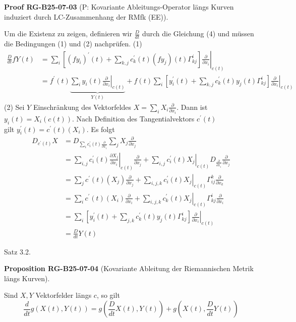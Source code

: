\documentclass[10pt, letterpaper]{article}
\newcommand{\CustomHeading}[3]{%
  \par\medskip\noindent%
  \textbf{#1 #2} \textnormal{(#3)}.\enskip%
}
\newenvironment{PROP}[2]{\begin{unitbox}\CustomHeading{Proposition}{#1}{#2}}{\end{unitbox}}
\newenvironment{PROOF}[2]{\begin{unitbox}\CustomHeading{Proof}{#1}{#2}}{\end{unitbox}}
\begin{document}
\begin{PROOF}{RG-B25-07-03}{P: Kovariante Ableitungs-Operator längs Kurven induziert durch LC-Zusammenhang der RMfk (EE)}
Um die Existenz zu zeigen, definieren wir $\frac{D}{d t}$ durch die Gleichung (4) und müssen die Bedingungen (1) und (2) nachprüfen.
(1)
$$
\begin{aligned}
\frac{D}{d t} f Y(t) & =\left.\sum_{i}\left[\left(f y_{i}\right)^{\prime}(t)+\sum_{k, j} c_{k}^{\prime}(t)\left(f y_{j}\right)(t) \Gamma_{k j}^{i}\right] \frac{\partial}{\partial x_{i}}\right|_{c(t)} \\
& =f^{\prime}(t) \underbrace{\left.\sum_{i} y_{i}(t) \frac{\partial}{\partial x_{i}}\right|_{c(t)}}_{Y(t)}+\left.f(t) \sum_{i}\left[y_{i}^{\prime}(t)+\sum_{k, j} c_{k}^{\prime}(t) y_{j}(t) \Gamma_{k j}^{i}\right] \frac{\partial}{\partial x_{i}}\right|_{c(t)}
\end{aligned}
$$
(2) Sei $Y$ Einschränkung des Vektorfeldes $X=\sum_{i} X_{i} \frac{\partial}{\partial x_{i}}$. Dann ist $y_{i}(t)=X_{i}(c(t))$. Nach Definition des Tangentialvektors $c^{\prime}(t)$\\
gilt $y_{i}^{\prime}(t)=c^{\prime}(t)\left(X_{i}\right)$. Es folgt
$$
\begin{aligned}
D_{c^{\prime}(t)} X & =D_{\sum_{i} c_{i}^{\prime}(t) \frac{\partial}{\partial x_{i}}} \sum_{j} X_{j} \frac{\partial}{\partial x_{j}} \\
& =\left.\sum_{i, j} c_{i}^{\prime}(t) \frac{\partial X_{j}}{\partial x_{i}}\right|_{c(t)} \frac{\partial}{\partial x_{j}}+\left.\sum_{i, j} c_{i}^{\prime}(t) X_{j}\right|_{c(t)} D_{\frac{\partial}{\partial x_{i}}} \frac{\partial}{\partial x_{j}} \\
& =\sum_{j} c^{\prime}(t)\left(X_{j}\right) \frac{\partial}{\partial x_{j}}+\left.\sum_{i, j, k} c_{i}^{\prime}(t) X_{j}\right|_{c(t)} \Gamma_{i j}^{k} \frac{\partial}{\partial x_{k}} \\
& =\sum_{i} c^{\prime}(t)\left(X_{i}\right) \frac{\partial}{\partial x_{i}}+\left.\sum_{i, j, k} c_{k}^{\prime}(t) X_{j}\right|_{c(t)} \Gamma_{k j}^{i} \frac{\partial}{\partial x_{i}} \\
& =\left.\sum_{i}\left[y_{i}^{\prime}(t)+\sum_{j, k} c_{k}^{\prime}(t) y_{j}(t) \Gamma_{k j}^{i}\right] \frac{\partial}{\partial x_{i}}\right|_{c(t)} \\
& =\frac{D}{d t} Y(t)
\end{aligned}
$$
\end{PROOF}





Satz 3.2. 


\begin{PROP}{RG-B25-07-04}{Kovariante Ableitung der Riemannischen Metrik längs Kurven}
Sind $X,Y$ Vektorfelder längs $c$, so gilt
$$
\frac{d}{d t} g(X(t), Y(t))=g\left(\frac{D}{d t} X(t), Y(t)\right)+g\left(X(t), \frac{D}{d t} Y(t)\right)
$$
\end{PROP}
\end{document}
